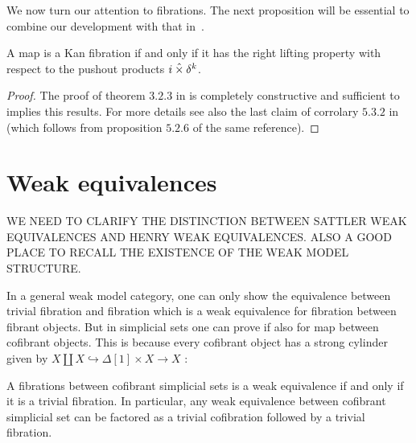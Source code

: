 \documentclass[reqno,10pt,a4paper,oneside,draft]{amsart}
\begin{document}

\bigskip

We now turn our attention to fibrations. The next proposition will be essential to combine our development with that in~\cite{gambino2017frobenius}.




\begin{proposition} A map is a Kan fibration if and only if it has the right lifting property with respect to the pushout products $i \mathbin{\hat{\times}} \delta^k$.
\end{proposition} 

\begin{proof}The proof of theorem $3.2.3$ in \cite{joyal-tierney:simplicial-homotopy-theory} is completely constructive and sufficient to implies this results.
For more details see also the last claim of corrolary $5.3.2$ in \cite{henry2018wms} (which follows from proposition $5.2.6$ of the same reference). 
\end{proof}

\section{Weak equivalences} 

WE NEED TO CLARIFY THE DISTINCTION BETWEEN SATTLER WEAK EQUIVALENCES AND HENRY WEAK EQUIVALENCES. ALSO A GOOD PLACE TO RECALL THE EXISTENCE OF THE WEAK MODEL STRUCTURE.


\bigskip

In a general weak model category, one can only show the equivalence between trivial fibration and fibration which is a weak equivalence for fibration between fibrant objects. But in simplicial sets one can prove if also for map between cofibrant objects. This is because every cofibrant object has a strong cylinder given by $X \coprod X \hookrightarrow \Delta[1] \times X \rightarrow X$ :

\begin{lemma}\label{lemma:triv_fib_are_we}
A fibrations between cofibrant simplicial sets is a weak equivalence if and only if it is a trivial fibration.
In particular, any weak equivalence between cofibrant simplicial set can be factored as a trivial cofibration followed by a trivial fibration.
\end{lemma}
\end{document}
